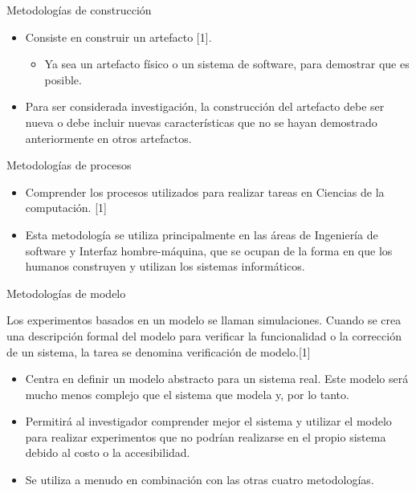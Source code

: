 \begin{frame}{Metodologías de construcción}
\begin{block}{}
\begin{itemize}
    \item Consiste en construir un artefacto [1].
    \begin{itemize}
        \item Ya sea un artefacto físico o un sistema de software, para demostrar que es posible. 
    \end{itemize}
    \item Para ser considerada investigación, la construcción del artefacto debe ser nueva o debe incluir nuevas características que no se hayan demostrado anteriormente en otros artefactos.
\end{itemize}
 \end{block} 
\end{frame}

\begin{frame}{Metodologías de procesos}
\begin{block}{}
  \begin{itemize}
    \item Comprender los procesos utilizados para realizar tareas en  Ciencias de la computación. [1]
    \item Esta metodología se utiliza principalmente en las áreas de Ingeniería de software y Interfaz hombre-máquina, que se ocupan de la forma en que los humanos construyen y utilizan los sistemas informáticos. 
\end{itemize}  
 \end{block} 
\end{frame}

\begin{frame}{Metodologías de modelo}
\begin{block}{}
Los experimentos basados en un modelo se llaman simulaciones. Cuando se crea una descripción formal del modelo para verificar la funcionalidad o la corrección de un sistema, la tarea se denomina verificación de modelo.[1]
\begin{itemize}
    \item Centra en definir un modelo abstracto para un sistema real. Este modelo será mucho menos complejo que el sistema que modela y, por lo tanto.
    \item Permitirá al investigador comprender mejor el sistema y utilizar el modelo para realizar experimentos que no podrían realizarse en el propio sistema debido al costo o la accesibilidad. 
    \item Se utiliza a menudo en combinación con las otras cuatro metodologías.
\end{itemize} 
 \end{block} 
\end{frame}
